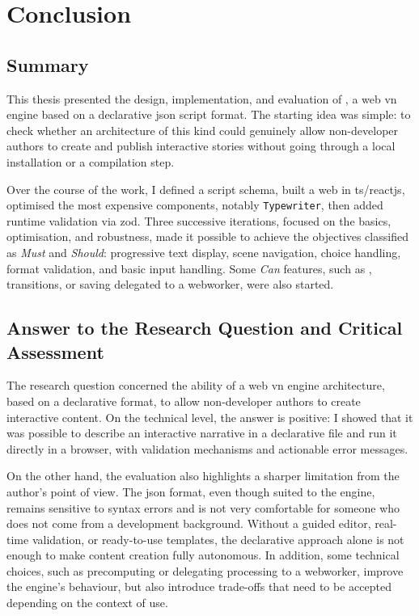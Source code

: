 \section{Conclusion}
\label{chap:conclusion}

\subsection{Summary}
This thesis presented the design, implementation, and evaluation of \nsit, a web \acrlong{vn} engine based on a declarative \gls{json} script format. The starting idea was simple: to check whether an architecture of this kind could genuinely allow non-developer authors to create and publish interactive stories without going through a local installation or a compilation step.

Over the course of the work, I defined a script \gls{schema}, built a web  in \gls{ts}/\gls{reactjs}, optimised the most expensive components, notably \texttt{Typewriter}, then added runtime validation via \gls{zod}. Three successive iterations, focused on the basics, optimisation, and robustness, made it possible to achieve the objectives classified as \textit{Must} and \textit{Should}: progressive text display, scene navigation, choice handling, format validation, and basic input handling. Some \textit{Can} features, such as , transitions, or saving delegated to a \gls{webworker}, were also started.


\subsection{Answer to the Research Question and Critical Assessment}
The research question concerned the ability of a web \gls{vn} engine architecture, based on a declarative format, to allow non-developer authors to create interactive content. On the technical level, the answer is positive: I showed that it was possible to describe an interactive narrative in a declarative file and run it directly in a browser, with validation mechanisms and actionable error messages.

On the other hand, the evaluation also highlights a sharper limitation from the author's point of view. The \gls{json} format, even though suited to the engine, remains sensitive to syntax errors and is not very comfortable for someone who does not come from a development background. Without a guided editor, real-time validation, or ready-to-use templates, the declarative approach alone is not enough to make content creation fully autonomous. In addition, some technical choices, such as precomputing  or delegating processing to a \gls{webworker}, improve the engine's behaviour, but also introduce trade-offs that need to be accepted depending on the context of use.

